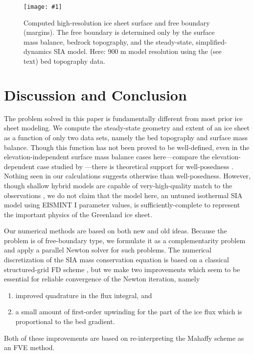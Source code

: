 \documentclass[twocolumn,a4paper]{igs}
\newcommand{\onecol}[1]{\texttt{[image: \#1]}}
\begin{document}
\begin{figure}[ht]
\onecol{grnwinset.pdf}
\caption{Computed high-resolution ice sheet surface and free boundary (margins).  The free boundary is determined only by the surface mass balance, bedrock topography, and the steady-state, simplified-dynamics SIA model.  Here: 900 m model resolution using the \MCB (see text) bed topography data.}
\label{fig:grnwinset}
\end{figure}


\section{Discussion and Conclusion}

The problem solved in this paper is fundamentally different from most prior ice sheet modeling.  We compute the steady-state geometry and extent of an ice sheet as a function of only two data sets, namely the bed topography and surface mass balance.  Though this function has not been proved to be well-defined, even in the elevation-independent surface mass balance cases here---compare the elevation-dependent case studied by \cite{Jouvetetal2011}---there is theoretical support for well-posedness \citep{JouvetBueler2012}.  Nothing seen in our calculations suggests otherwise than well-posedness.  However, though shallow hybrid models are capable of very-high-quality match to the observations \citep{Aschwandenetal2015}, we do not claim that the model here, an untuned isothermal SIA model using EISMINT I parameter values, is sufficiently-complete to represent the important physics of the Greenland ice sheet.

Our numerical methods are based on both new and old ideas.  Because the problem is of free-boundary type, we formulate it as a complementarity problem and apply a parallel Newton solver for such problems.  The numerical discretization of the SIA mass conservation equation is based on a classical structured-grid FD scheme \citep{Mahaffy1976}, but we make two improvements which seem to be essential for reliable convergence of the Newton iteration, namely
\renewcommand{\labelenumi}{\emph{(\roman{enumi})}}
\begin{enumerate}
\item improved quadrature in the flux integral, and
\item a small amount of first-order upwinding for the part of the ice flux which is proportional to the bed gradient.
\end{enumerate}
Both of these improvements are based on re-interpreting the Mahaffy scheme as an FVE method.
\end{document}
